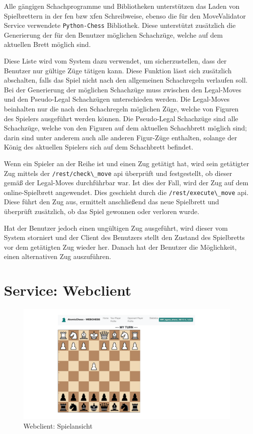 Alle gängigen Schachprogramme und Bibliotheken unterstützen das Laden
von Spielbrettern in der \gls{fen} bzw \gls{xfen} Schreibweise, ebenso
die für den MoveValidator Service verwendete
\passthrough{\lstinline!Python-Chess!}\cite{pythonchesslib}
Bibliothek. Diese unterstützt zusätzlich die Generierung der für den
Benutzer möglichen Schachzüge, welche auf dem aktuellen Brett möglich
sind.

Diese Liste wird vom System dazu verwendet, um sicherzustellen, dass der
Benutzer nur gültige Züge tätigen kann. Diese Funktion lässt sich
zusätzlich abschalten, falls das Spiel nicht nach den allgemeinen
Schachregeln verlaufen soll. Bei der Generierung der möglichen
Schachzüge muss zwischen den Legal-Moves und den Pseudo-Legal
Schachzügen unterschieden werden. Die Legal-Moves beinhalten nur die
nach den Schachregeln möglichen Züge, welche von Figuren des Spielers
ausgeführt werden können. Die Pseudo-Legal Schachzüge sind alle
Schachzüge, welche von den Figuren auf dem aktuellen Schachbrett möglich
sind; darin sind unter anderem auch alle anderen Figur-Züge enthalten,
solange der König des aktuellen Spielers sich auf dem Schachbrett
befindet.

Wenn ein Spieler an der Reihe ist und einen Zug getätigt hat, wird sein
getätigter Zug mittels der \passthrough{\lstinline!/rest/check\_move!}
\gls{api} überprüft und festgestellt, ob dieser gemäß der Legal-Moves
durchführbar war. Ist dies der Fall, wird der Zug auf dem
online-Spielbrett angewendet. Dies geschieht durch die
\passthrough{\lstinline!/rest/execute\_move!} \gls{api}. Diese führt den
Zug aus, ermittelt anschließend das neue Spielbrett und überprüft
zusätzlich, ob das Spiel gewonnen oder verloren wurde.

Hat der Benutzer jedoch einen ungültigen Zug ausgeführt, wird dieser vom
System storniert und der Client des Benutzers stellt den Zustand des
Spielbretts vor dem getätigten Zug wieder her. Danach hat der Benutzer
die Möglichkeit, einen alternativen Zug auszuführen.

\hypertarget{service-webclient}{%
\section{Service: Webclient}\label{service-webclient}}

\begin{figure}
\centering
\includegraphics{images/ATC_webclient.png}
\caption{Webclient: Spielansicht \label{ATC_webclient}}
\end{figure}

